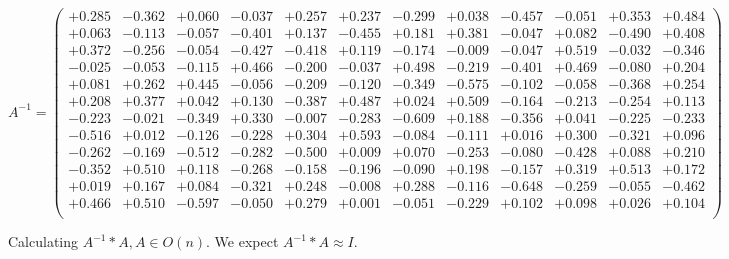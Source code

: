 \documentclass[9pt]{article}
\theoremstyle{plain}
\theoremstyle{definition}
\theoremstyle{remark}
\numberwithin{equation}{section}
\begin{document}
$A^{-1} = \left(
\begin{array}{
cccccccccccc}
+0.285 & -0.362 & +0.060 & -0.037 & +0.257 & +0.237 & -0.299 & +0.038 & -0.457 & -0.051 & +0.353 & +0.484 \\
+0.063 & -0.113 & -0.057 & -0.401 & +0.137 & -0.455 & +0.181 & +0.381 & -0.047 & +0.082 & -0.490 & +0.408 \\
+0.372 & -0.256 & -0.054 & -0.427 & -0.418 & +0.119 & -0.174 & -0.009 & -0.047 & +0.519 & -0.032 & -0.346 \\
-0.025 & -0.053 & -0.115 & +0.466 & -0.200 & -0.037 & +0.498 & -0.219 & -0.401 & +0.469 & -0.080 & +0.204 \\
+0.081 & +0.262 & +0.445 & -0.056 & -0.209 & -0.120 & -0.349 & -0.575 & -0.102 & -0.058 & -0.368 & +0.254 \\
+0.208 & +0.377 & +0.042 & +0.130 & -0.387 & +0.487 & +0.024 & +0.509 & -0.164 & -0.213 & -0.254 & +0.113 \\
-0.223 & -0.021 & -0.349 & +0.330 & -0.007 & -0.283 & -0.609 & +0.188 & -0.356 & +0.041 & -0.225 & -0.233 \\
-0.516 & +0.012 & -0.126 & -0.228 & +0.304 & +0.593 & -0.084 & -0.111 & +0.016 & +0.300 & -0.321 & +0.096 \\
-0.262 & -0.169 & -0.512 & -0.282 & -0.500 & +0.009 & +0.070 & -0.253 & -0.080 & -0.428 & +0.088 & +0.210 \\
-0.352 & +0.510 & +0.118 & -0.268 & -0.158 & -0.196 & -0.090 & +0.198 & -0.157 & +0.319 & +0.513 & +0.172 \\
+0.019 & +0.167 & +0.084 & -0.321 & +0.248 & -0.008 & +0.288 & -0.116 & -0.648 & -0.259 & -0.055 & -0.462 \\
+0.466 & +0.510 & -0.597 & -0.050 & +0.279 & +0.001 & -0.051 & -0.229 & +0.102 & +0.098 & +0.026 & +0.104 \\
\end{array}
\right)$ \newline 

Calculating $A^{-1} *A  ,  A \in O(n)$.   We expect $A^{-1} *A  \approx I$. 
\end{document}
